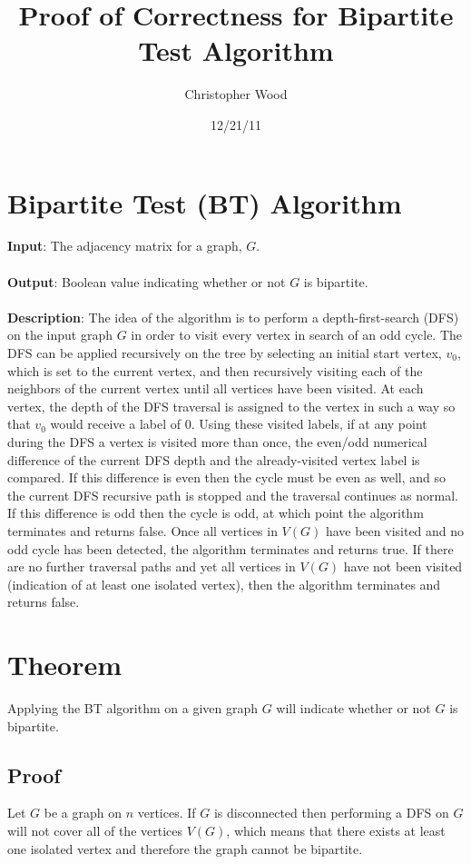 \documentclass[a4paper,10pt]{article}
\title{Proof of Correctness for Bipartite Test Algorithm}
\author{Christopher Wood}
\date{12/21/11}
\begin{document}
\maketitle

\section{Bipartite Test (BT) Algorithm}
{\bf Input}: The adjacency matrix for a graph, $G$. \\ \\
{\bf Output}: Boolean value indicating whether or not $G$ is bipartite. \\ \\
{\bf Description}: The idea of the algorithm is to perform a depth-first-search (DFS) on the input graph $G$ in order to visit every vertex in search of an odd cycle. The DFS can be applied recursively on the tree by selecting an initial start vertex, $v_{0}$, which is set to the current vertex, and then recursively visiting each of the neighbors of the current vertex until all vertices have been visited. At each vertex, the depth of the DFS traversal is assigned to the vertex in such a way so that $v_{0}$ would receive a label of $0$. Using these visited labels, if at any point during the DFS a vertex is visited more than once, the even/odd numerical difference of the current DFS depth and the already-visited vertex label is compared. If this difference is even then the cycle must be even as well, and so the current DFS recursive path is stopped and the traversal continues as normal. If this difference is odd then the cycle is odd, at which point the algorithm terminates and returns false. Once all vertices in $V(G)$ have been visited and no odd cycle has been detected, the algorithm terminates and returns true. If there are no further traversal paths and yet all vertices in $V(G)$ have not been visited (indication of at least one isolated vertex), then the algorithm terminates and returns false.

\section{Theorem}
Applying the BT algorithm on a given graph $G$ will indicate whether or not $G$ is bipartite.

\subsection{Proof}
Let $G$ be a graph on $n$ vertices. If $G$ is disconnected then performing a DFS on $G$ will not cover all of the vertices $V(G)$, which means that there exists at least one isolated vertex and therefore the graph cannot be bipartite. 
\end{document}
